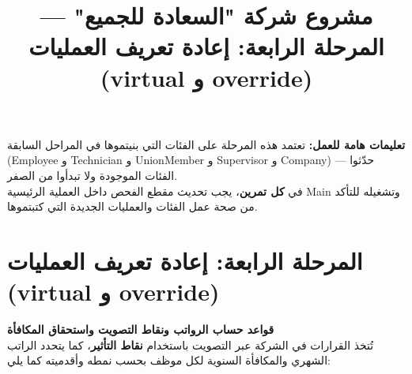 \documentclass[14pt]{extarticle}
\title{مشروع شركة "السعادة للجميع" — المرحلة الرابعة: إعادة تعريف العمليات (\textenglish{virtual} و \textenglish{override})}
\begin{document}
\maketitle
\thispagestyle{fancy}

\begin{boxWarning}
\textbf{تعليمات هامة للعمل:}
تعتمد هذه المرحلة على الفئات التي بنيتموها في المراحل السابقة (\textenglish{Employee} و \textenglish{Technician} و \textenglish{UnionMember} و \textenglish{Supervisor} و \textenglish{Company}) — حدّثوا الفئات الموجودة ولا تبدأوا من الصفر. \\
في \textbf{كل تمرين}، يجب تحديث مقطع الفحص داخل العملية الرئيسية \textenglish{Main} وتشغيله للتأكد من صحة عمل الفئات والعمليات الجديدة التي كتبتموها.
\end{boxWarning}

\section*{المرحلة الرابعة: إعادة تعريف العمليات (\textenglish{virtual} و \textenglish{override})}

\textbf{قواعد حساب الرواتب ونقاط التصويت واستحقاق المكافأة} \\
تُتخذ القرارات في الشركة عبر التصويت باستخدام \textbf{نقاط التأثير}، كما يتحدد الراتب الشهري والمكافأة السنوية لكل موظف بحسب نمطه وأقدميته كما يلي:
\end{document}
